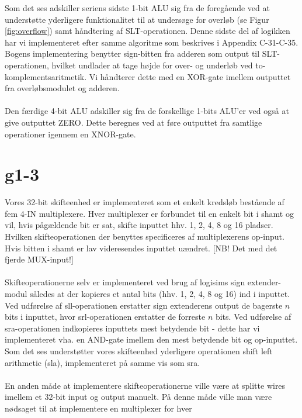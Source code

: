 \documentclass[10pt,a4paper,danish]{article}
\begin{document}
Som det ses adskiller seriens sidste 1-bit ALU sig fra de foregående ved at understøtte yderligere funktionalitet
til at undersøge for overløb (se Figur \ref{fig:overflow}) samt håndtering af SLT-operationen. Denne sidste del af 
logikken har vi implementeret efter samme algoritme som beskrives i Appendix C-31-C-35. Bogens implementering
benytter sign-bitten fra adderen som output til SLT-operationen, hvilket undlader at tage højde for 
over- og underløb ved to-komplementsaritmetik. Vi håndterer dette med en XOR-gate imellem outputtet fra 
overløbsmodulet og adderen. 
 
\paragraph{}
Den færdige 4-bit ALU adskiller sig fra de forskellige 1-bits ALU'er ved også at give outputtet ZERO. Dette 
beregnes ved at føre outputtet fra samtlige operationer igennem en XNOR-gate. 

\section{g1-3}
Vores 32-bit skifteenhed er implementeret som et enkelt kredsløb bestående af fem 4-IN multiplexere. 
Hver multiplexer er forbundet til en enkelt bit i shamt og vil, hvis pågældende bit er sat, skifte 
inputtet hhv. 1, 2, 4, 8 og 16 pladser. Hvilken skifteoperationen der benyttes specificeres af 
multiplexerens op-input. Hvis bitten i shamt er lav videresendes inputtet uændret. [NB! Det med 
det fjerde MUX-input!]

\paragraph{}
Skifteoperationerne selv er implementeret ved brug af logisims sign extender-modul således at 
der kopieres et antal bits (hhv. 1, 2, 4, 8 og 16) ind i inputtet. Ved udførelse
af sll-operationen erstatter sign extenderens output de bagerste $n$ bits i inputtet, hvor 
srl-operationen erstatter de forreste $n$ bits. Ved udførelse af sra-operationen indkopieres
inputtets mest betydende bit - dette har vi implementeret vha. en AND-gate imellem den mest
betydende bit og op-inputtet. Som det ses understøtter vores skifteenhed yderligere 
operationen shift left arithmetic (sla), implementeret på samme vis som sra.

\paragraph{}
En anden måde at implementere skifteoperationerne ville være at splitte wires imellem
et 32-bit input og output manuelt. På denne måde ville man være nødsaget til at implementere
en multiplexer for hver 
\end{document}
